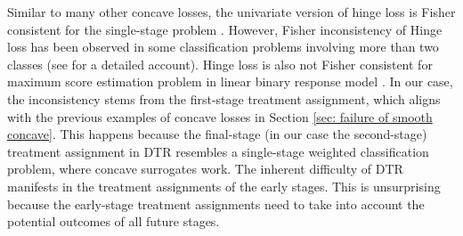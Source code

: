 \documentclass[preprint] {imsart}
\begin{document}
{%




 
 



 
\label{page: hinge loss statiic} Similar to many other concave losses, the univariate version of hinge loss is Fisher consistent for the single-stage problem \citep[][see also Figure \ref{Figure: 1d functions}]{zhao2012}. However, Fisher inconsistency of Hinge loss has been observed in  some classification problems involving more than two classes (see \cite{liu2007} for a detailed account). Hinge loss is also not Fisher consistent for maximum score estimation problem in linear binary response model  \citep{feng2022nonregular}. In our case, the inconsistency stems from the first-stage treatment assignment, which aligns with the previous examples of concave losses in Section \ref{sec: failure of smooth concave}. This happens because the final-stage (in our case the second-stage) treatment assignment in DTR resembles a single-stage weighted classification problem, where concave surrogates work. The inherent difficulty of DTR  manifests in the treatment assignments of the early stages. This is unsurprising because the early-stage treatment assignments need to take into account the  potential outcomes of all future stages.

}
\end{document}
